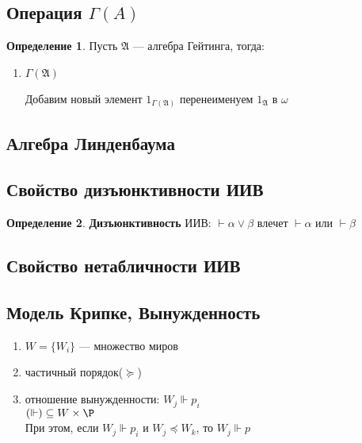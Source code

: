 \documentclass[english]{article}
\newcommand{\A}{\mathfrak{A}}
\theoremstyle{plain}
\theoremstyle{remark}
\theoremstyle{definition}
\newtheorem*{definition}{Определение}
\begin{document}
\subsection{Операция \(\Gamma(A)\)}
\label{sec:org52148fc}
\begin{definition}
Пусть \(\A\) --- алгебра Гейтинга, тогда:
\begin{enumerate}
\item \(\Gamma(\A)\) \\
\begin{center}
\end{center}

Добавим новый элемент \(1_{\Gamma(\A)}\) перенеименуем \(1_\A\) в  \(\omega\)
\end{enumerate}
\label{org24ba717}
\end{definition}
\subsection{Алгебра Линденбаума}
\label{sec:org9aa8df2}
\subsection{Свойство дизъюнктивности ИИВ}
\label{sec:org220356b}
\begin{definition}
\textbf{Дизъюнктивность} ИИВ: \(\vdash \alpha \vee \beta\) влечет \(\vdash \alpha\) или \(\vdash \beta\)
\label{org3f0c408}
\end{definition}
\subsection{Свойство нетабличности ИИВ}
\label{sec:orge6e4b1a}
\subsection{Модель Крипке, Вынужденность}
\label{sec:orge1615fc}
\begin{defintion}
\-
\begin{enumerate}
\item \(W = \{W_i\}\) --- множество миров
\item частичный порядок(\(\succeq\))
\item отношение вынужденности: \(W_j \Vdash p_i\) \\
\((\Vdash)  \subseteq W \times \P\) \\
При этом, если \(W_j \Vdash p_i\) и \(W_j \preceq W_k\), то \(W_j \Vdash p\)
\end{enumerate}
\label{org7630947}
\end{defintion}
\end{document}
